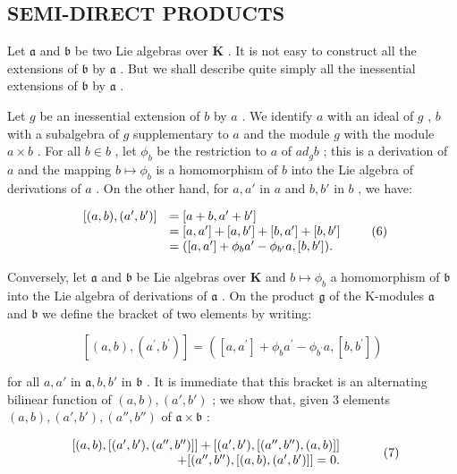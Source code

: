 \subsection{SEMI-DIRECT PRODUCTS}

Let \(\mathfrak{a}\) and \(\mathfrak{b}\) be two Lie algebras over \(\mathbf{K}\) . It is not easy to construct all the extensions of \(\mathfrak{b}\) by \(\mathfrak{a}\) . But we shall describe quite simply all the inessential extensions of \(\mathfrak{b}\) by \(\mathfrak{a}\) .

Let \(g\) be an inessential extension of \(b\) by \(a\) . We identify \(a\) with an ideal of \(g\) , \(b\) with a subalgebra of \(g\) supplementary to \(a\) and the module \(g\) with the module \(a \times b\) . For all \(b \in b\) , let \(\phi_b\) be the restriction to \(a\) of \(ad_g b\) ; this is a derivation of \(a\) and the mapping \(b \mapsto \phi_b\) is a homomorphism of \(b\) into the Lie algebra of derivations of \(a\) . On the other hand, for \(a, a'\) in \(a\) and \(b, b'\) in \(b\) , we have:

\[
\begin{array}{r l} {[ (a, b), (a ^ {\prime}, b ^ {\prime}) ]} & {= [ a + b, a ^ {\prime} + b ^ {\prime} ]} \\ & {= [ a, a ^ {\prime} ] + [ a, b ^ {\prime} ] + [ b, a ^ {\prime} ] + [ b, b ^ {\prime} ]} \\ & {= ([ a, a ^ {\prime} ] + \phi_ {b} a ^ {\prime} - \phi_ {b ^ {\prime}} a, [ b, b ^ {\prime} ]).} \end{array}\tag{6}
\]

Conversely, let \(\mathfrak{a}\) and \(\mathfrak{b}\) be Lie algebras over \(\mathbf{K}\) and \(b \mapsto \phi_b\) a homomorphism of \(\mathfrak{b}\) into the Lie algebra of derivations of \(\mathfrak{a}\) . On the product \(\mathfrak{g}\) of the K-modules \(\mathfrak{a}\) and \(\mathfrak{b}\) we define the bracket of two elements by writing:

\[
[ (a, b), (a ^ {\prime}, b ^ {\prime}) ] = ([ a, a ^ {\prime} ] + \phi_ {b} a ^ {\prime} - \phi_ {b ^ {\prime}} a, [ b, b ^ {\prime} ])
\]

for all \(a, a'\) in \(\mathfrak{a}, b, b'\) in \(\mathfrak{b}\) . It is immediate that this bracket is an alternating bilinear function of \((a, b), (a', b')\) ; we show that, given 3 elements \((a, b), (a', b'), (a'', b'')\) of \(\mathfrak{a} \times \mathfrak{b}\) :

\[
\begin{array}{r l} {[ (a, b), [ (a ^ {\prime}, b ^ {\prime}), (a ^ {\prime \prime}, b ^ {\prime \prime}) ] ] + [ (a ^ {\prime}, b ^ {\prime}), [ (a ^ {\prime \prime}, b ^ {\prime \prime}), (a, b) ] ]} & \\ {+ [ (a ^ {\prime \prime}, b ^ {\prime \prime}), [ (a, b), (a ^ {\prime}, b ^ {\prime}) ] ] = 0.} \end{array}\tag{7}
\]


